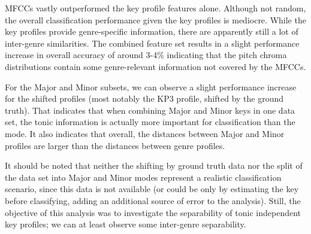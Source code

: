 \documentclass{article}
\begin{document}
MFCCs vastly outperformed the key profile features alone. Although not random, the overall classification performance given the key profiles is mediocre. While the key profiles provide genre-specific information, there are apparently still a lot of inter-genre similarities. The combined feature set results in a slight performance increase in overall accuracy of around 3-4\% indicating that the pitch chroma distributions contain some genre-relevant information not covered by the MFCCs. 

For the Major and Minor subsets, we can observe a slight performance increase for the shifted profiles (most notably the KP3 profile, shifted by the ground truth). That indicates that when combining Major and Minor keys in one data set, the tonic information is actually more important for classification than the mode. It also indicates that overall, the distances between Major and Minor profiles are larger than the distances between genre profiles. 

It should be noted that neither the shifting by ground truth data nor the split of the data set into Major and Minor modes represent a realistic classification scenario, since this data is not available (or could be only by estimating the key before classifying, adding an additional source of error to the analysis). 
Still, the objective of this analysis was to investigate the separability of tonic independent key profiles; we can at least observe some inter-genre separability.



\end{document}
